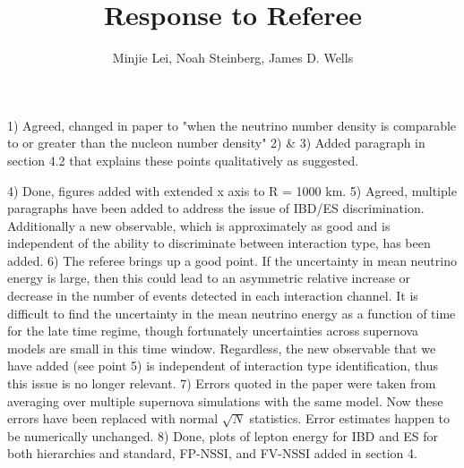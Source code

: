\documentclass[aps,onecolumn,twoside,secnumarabic,balancelastpage,amsmath,amssymb,nofootinbib,hyperref=pdftex]{revtex4}
\begin{document}
\title{Response to Referee }
\author         {Minjie Lei, Noah Steinberg, James D. Wells}

\maketitle


1) Agreed, changed in paper to "when the neutrino number density is comparable to or greater than the nucleon number density"
\vskip 0.18in
2) \& 3) Added paragraph in section 4.2 that explains these points qualitatively as suggested. 

\vskip 0.18in
4) Done, figures added with extended x axis to R = 1000 km. 
\vskip 0.18in
5) Agreed, multiple paragraphs have been added to address the issue of IBD/ES discrimination. Additionally a new observable, which is approximately as good and is independent of the ability to discriminate between interaction type, has been added.
\vskip 0.18in
6) The referee brings up a good point. If the uncertainty in mean neutrino energy is large, then this could lead to an asymmetric relative increase or decrease in the number of events detected in each interaction channel. It is difficult to find the uncertainty in the mean neutrino energy as a function of time for the late time regime, though fortunately uncertainties across supernova models are small in this time window. Regardless, the new observable that we have added (see point 5) is independent of interaction type identification, thus this issue is no longer relevant. 
\vskip 0.18in
7) Errors quoted in the paper were taken from averaging over multiple supernova simulations with the same model. Now these errors have been replaced with normal $\sqrt{N}$ statistics. Error estimates happen to be numerically unchanged. 
\vskip 0.18in
8) Done, plots of lepton energy for IBD and ES for both hierarchies and standard, FP-NSSI, and FV-NSSI added in section 4.
\end{document}
